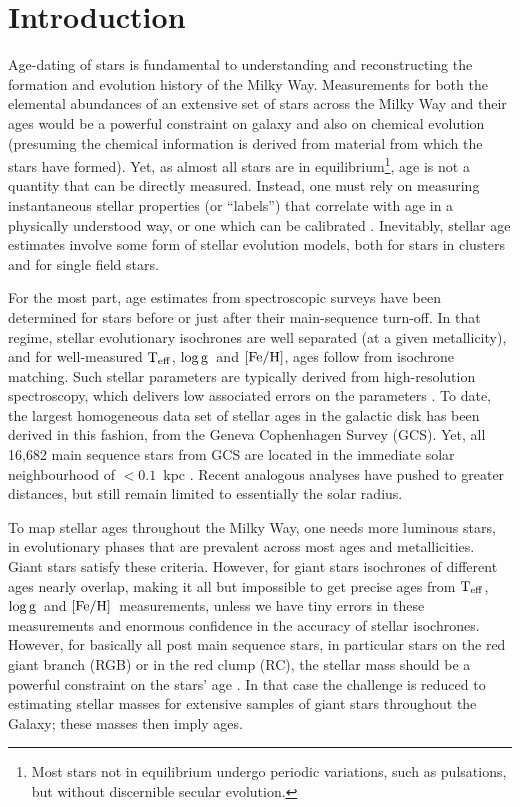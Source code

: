 \documentclass[12pt, preprint]{aastex}
\newcommand{\teff}{\mbox{$\rm T_{eff}$}}
\newcommand{\feh}{\mbox{$\rm [Fe/H]$}}
\newcommand{\logg}{\mbox{$\rm \log g$}}
\begin{document}

\section{Introduction}\label{sec:Intro}

Age-dating of stars is fundamental to understanding and reconstructing the formation and evolution history of the Milky Way. Measurements for both the elemental abundances of an extensive set of stars across the Milky Way and their ages would be a powerful constraint on galaxy and also on chemical evolution (presuming the chemical information is derived from material from which the stars have formed).
Yet, as almost all stars are in equilibrium\footnote{Most stars not in equilibrium undergo periodic variations, such as pulsations, but without discernible secular evolution.}, age is not a quantity that can be directly measured. Instead, one must rely on measuring instantaneous stellar properties (or ``labels'') that correlate with age in a physically understood way, or one which can be calibrated \citep[see][for an excellent review]{soderblom2010}.
Inevitably, stellar age estimates involve some form of stellar evolution models, both for stars in clusters and for single field stars. 

For the most part, age estimates from spectroscopic surveys have been determined for stars before or just after their main-sequence turn-off. 
In that regime, stellar evolutionary isochrones are well separated (at a given metallicity), and for well-measured \teff, \logg\ and \feh, ages follow from isochrone matching. 
Such stellar parameters are typically derived from high-resolution spectroscopy, which delivers low associated errors on the parameters \citep[e.g.][]{Bensby2013, Casagrande2011, haywood2013, B2014}.  To date, the largest homogeneous data set of stellar ages in the galactic disk has been derived in this fashion, from the Geneva Cophenhagen Survey (GCS). Yet, all 16,682 main sequence stars from GCS are located in the immediate solar neighbourhood of $<0.1$~kpc \citep{nordstrom2004short}.
Recent analogous analyses \citep[e.g.][]{haywood2013, B2014} have pushed to greater distances, but still remain limited to essentially the solar radius.

To map stellar ages throughout the Milky Way, one needs more luminous stars, in evolutionary phases that are prevalent 
across most ages and metallicities. Giant stars satisfy these criteria. However, for giant stars isochrones of different ages nearly overlap, making it all but impossible to get precise ages from \teff , \logg\  and \feh\ measurements, unless we have tiny errors in these measurements
and enormous confidence in the accuracy of stellar isochrones. 
However, for basically all post main sequence stars, in particular stars on the red giant branch (RGB) or in the red clump (RC), the stellar mass should be a
powerful constraint on the stars' age \citep[see e.g.,][]{Martig2014}. In that case the challenge is reduced to estimating stellar masses for extensive samples
of giant stars throughout the Galaxy; these masses then imply ages.
\end{document}
